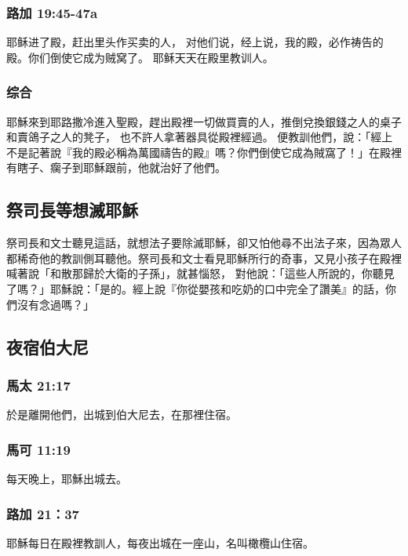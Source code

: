 \subsubsection{路加 19:45-47a}
耶稣进了殿，赶出里头作买卖的人， 对他们说，经上说，我的殿，必作祷告的殿。你们倒使它成为贼窝了。 耶稣天天在殿里教训人。 
\subsubsection{综合}
耶穌來到耶路撒冷進入聖殿，趕出殿裡一切做買賣的人，推倒兌換銀錢之人的桌子和賣鴿子之人的凳子， 也不許人拿著器具從殿裡經過。 便教訓他們，說：「經上不是記著說『我的殿必稱為萬國禱告的殿』嗎？你們倒使它成為賊窩了！」在殿裡有瞎子、瘸子到耶穌跟前，他就治好了他們。

\subsection{祭司長等想滅耶穌}
祭司長和文士聽見這話，就想法子要除滅耶穌，卻又怕他尋不出法子來，因為眾人都稀奇他的教訓側耳聽他。祭司長和文士看見耶穌所行的奇事，又見小孩子在殿裡喊著說「和散那歸於大衛的子孫」，就甚惱怒， 對他說：「這些人所說的，你聽見了嗎？」耶穌說：「是的。經上說『你從嬰孩和吃奶的口中完全了讚美』的話，你們沒有念過嗎？」

\subsection{夜宿伯大尼}

\subsubsection{馬太 21:17}
於是離開他們，出城到伯大尼去，在那裡住宿。
\subsubsection{馬可 11:19}
每天晚上，耶穌出城去。
\subsubsection{路加 21：37}
耶穌每日在殿裡教訓人，每夜出城在一座山，名叫橄欖山住宿。





